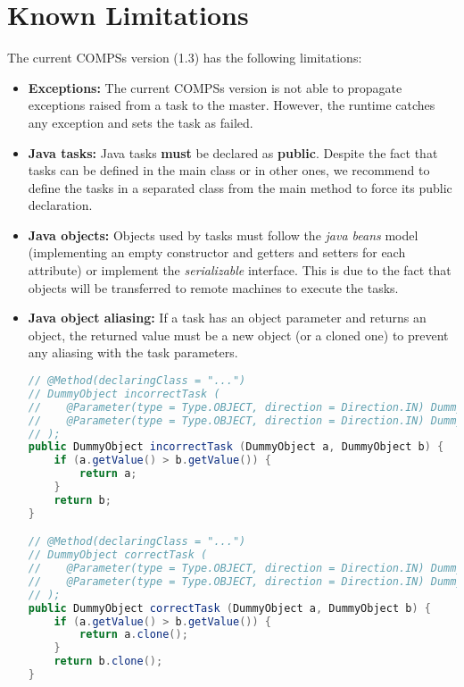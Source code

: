 \section{Known Limitations}
\label{sec:Known_Limitations}

The current COMPSs version (1.3) has the following limitations: 
\begin{itemize}
 \item \textbf{Exceptions:} \newline The current COMPSs version is not able to propagate exceptions raised from a task to the master. However, the runtime
 catches any exception and sets the task as failed.
 
 \item \textbf{Java tasks:} \newline Java tasks \textbf{must} be declared as \textbf{public}. Despite the fact that tasks can be
 defined in the main class or in other ones, we recommend to define the tasks in a separated class from the main method to force
 its public declaration.
 
 \item \textbf{Java objects:} \newline Objects used by tasks must follow the \textit{java beans} model (implementing an empty 
 constructor and getters and setters for each attribute) or implement the \textit{serializable} interface. This is due to the 
 fact that objects will be transferred to remote machines to execute the tasks.
 
 \item \textbf{Java object aliasing:} \newline If a task has an object parameter and returns an object, the returned value
 must be a new object (or a cloned one) to prevent any aliasing with the task parameters. 
 \begin{lstlisting}[language=java]
// @Method(declaringClass = "...")
// DummyObject incorrectTask (
//    @Parameter(type = Type.OBJECT, direction = Direction.IN) DummyObject a,
//    @Parameter(type = Type.OBJECT, direction = Direction.IN) DummyObject b
// );
public DummyObject incorrectTask (DummyObject a, DummyObject b) {
    if (a.getValue() > b.getValue()) {
        return a;
    }
    return b;
}

// @Method(declaringClass = "...")
// DummyObject correctTask (
//    @Parameter(type = Type.OBJECT, direction = Direction.IN) DummyObject a,
//    @Parameter(type = Type.OBJECT, direction = Direction.IN) DummyObject b
// );
public DummyObject correctTask (DummyObject a, DummyObject b) {
    if (a.getValue() > b.getValue()) {
        return a.clone();
    }
    return b.clone();
}


\end{lstlisting}
\end{itemize}
